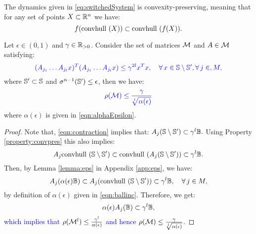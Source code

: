 \begin{property}\label{property:convpres}
The dynamics given in \eqref{eq:switchedSystem} is convexity-preserving, meaning that for any set of points $X \subset \mathbb{R}^n$ we have:
$$ f(\mbox{convhull }({X}))\subset \mbox{convhull }(f(X)). $$
\end{property}

\begin{lemma}\label{lemma:epsilon1}Let $\epsilon \in (0, 1)$ and $\gamma \in \mathbb{R}_{> 0}$. Consider the set of matrices $\mathcal{M}$ and $A \in \mathcal{M}$ satisfying:
\begin{equation}\label{eqn:contraction}\textcolor{blue}{(A_{j_1}\ldots A_{j_l}x)^T(A_{j_1}\ldots A_{j_l}x) \leq \gamma^{2l} x^Tx, \quad \forall\, x \in \mathbb{S} \setminus \mathbb{S}', \forall\,j \in, M,}\end{equation}
where $\mathbb{S}' \subset \mathbb{S}$ and $\sigma^{n-1}(\mathbb{S}') \leq \epsilon$, then we have:
\begin{equation*}
\textcolor{blue}{\rho(\mathcal{M}) \leq \frac{\gamma}{\sqrt[l]{\alpha(\epsilon)}}}
\end{equation*}
where $\alpha(\epsilon)$ is given in \eqref{eqn:alphaEpsilon}.
\end{lemma}
%
\begin{proof}Note that, \eqref{eqn:contraction} implies that:
$A_j (\mathbb{S} \setminus \mathbb{S}') \subset \gamma^l \mathbb{B}.$
Using Property \ref{property:convpres} this also implies:
$$A_j \mbox{convhull }(\mathbb{S} \setminus \mathbb{S}') \subset \mbox{convhull }(A_j(\mathbb{S} \setminus \mathbb{S}')) \subset \gamma^l \mathbb{B} .$$
Then, by Lemma \ref{lemma:eps} in Appendix \ref{app:eps}, we have:
$$A_j (\alpha(\epsilon) \mathbb{B}) \subset A_j (\mbox{convhull } (\mathbb{S} \setminus \mathbb{S}')) \subset \gamma^l\mathbb{B}, \quad  \forall\, j \in M,$$
by definition of $\alpha(\epsilon)$ given in \eqref{eqn:ballinc}. Therefore, we get:
$$\alpha(\epsilon) A_j (\mathbb{B}) \subset \gamma^l\mathbb{B},$$
\textcolor{blue}{which implies that $\rho(\mathcal{M}^l) \leq \frac{\gamma^l}{\alpha(\epsilon)}$ and hence $\rho(\mathcal{M}) \leq \frac{\gamma}{\sqrt[l]{\alpha(\epsilon)}}$.}
\end{proof}










